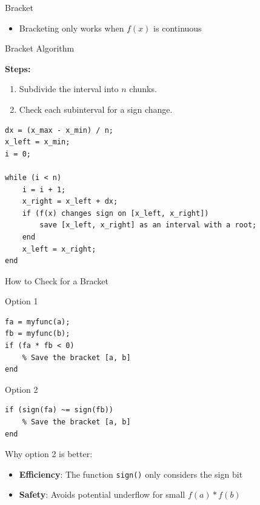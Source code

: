 \documentclass[10pt]{beamer}
\begin{document}
\begin{frame}{Bracket}

\begin{itemize}
\item Bracketing only works when $f(x)$ is continuous
\end{itemize}
\begin{center}
\end{center}
\end{frame}
\begin{frame}[fragile]{Bracket Algorithm}

\textbf{Steps:}\\
\begin{enumerate}
  \item Subdivide the interval into $n$ chunks.
  \item Check each subinterval for a sign change.
\end{enumerate}

\begin{lstlisting}[mathescape]
% Given: f(x), x_min, x_max, n
dx = (x_max - x_min) / n;
x_left = x_min;
i = 0;

while (i < n)
    i = i + 1;
    x_right = x_left + dx;
    if (f(x) changes sign on [x_left, x_right])
        save [x_left, x_right] as an interval with a root;
    end
    x_left = x_right;
end
\end{lstlisting}
\end{frame}
\begin{frame}[containsverbatim]{How to Check for a Bracket}

\begin{block}{Option 1}
\begin{verbatim}
fa = myfunc(a);
fb = myfunc(b);
if (fa * fb < 0)
    % Save the bracket [a, b]
end
\end{verbatim}
\end{block}

\begin{block}{Option 2}
\begin{verbatim}
if (sign(fa) ~= sign(fb))
    % Save the bracket [a, b]
end
\end{verbatim}
\end{block}
\medskip
Why option 2 is better:
\begin{itemize}
    \item \textbf{Efficiency}: The function \texttt{sign()} only considers the sign bit
    \item \textbf{Safety}: Avoids potential underflow for small $f(a)*f(b)$
\end{itemize}

\end{frame}
\end{document}
